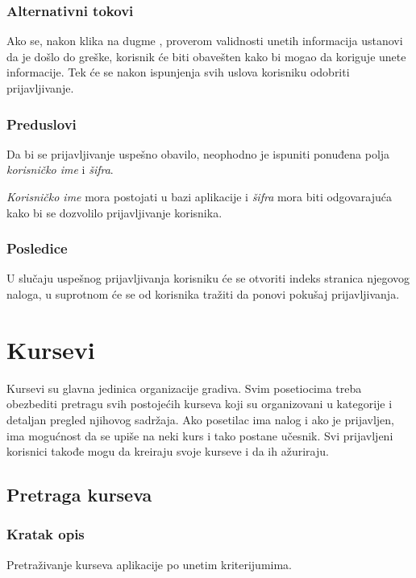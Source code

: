 \subsubsection{Alternativni tokovi}
Ako se, nakon klika na dugme , proverom validnosti unetih informacija ustanovi da je došlo do greške, korisnik će biti obavešten kako bi mogao da koriguje unete informacije.
Tek će se nakon ispunjenja svih uslova korisniku odobriti prijavljivanje.

\subsubsection{Preduslovi}
Da bi se prijavljivanje uspešno obavilo, neophodno je ispuniti ponuđena polja \emph{korisničko ime} i \emph{šifra}.

\emph{Korisničko ime} mora postojati u bazi aplikacije i \emph{šifra} mora biti odgovarajuća kako bi se dozvolilo prijavljivanje korisnika.

\subsubsection{Posledice}
U slučaju uspešnog prijavljivanja korisniku će se otvoriti indeks stranica njegovog naloga, u suprotnom će se od korisnika tražiti da ponovi pokušaj prijavljivanja.





\section{Kursevi}
\label{sec:kursevi}
Kursevi su glavna jedinica organizacije gradiva.
Svim posetiocima treba obezbediti pretragu svih postojećih kurseva koji su organizovani u kategorije i detaljan pregled njihovog sadržaja.
Ako posetilac ima nalog i ako je prijavljen, ima mogućnost da se upiše na neki kurs i tako postane učesnik.
Svi prijavljeni korisnici takođe mogu da kreiraju svoje kurseve i da ih ažuriraju.

\subsection{Pretraga kurseva}
\label{subsec:pretraga-kurseva}

\subsubsection{Kratak opis}
Pretraživanje kurseva aplikacije po unetim kriterijumima.

